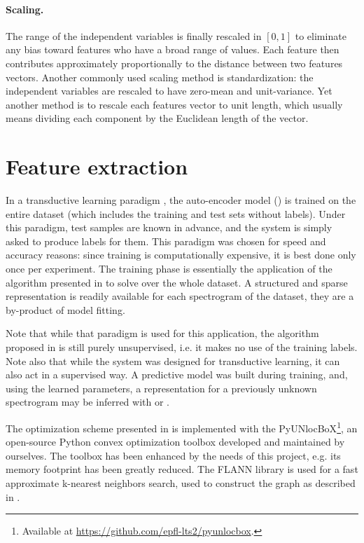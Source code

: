 \paragraph{Scaling.}
The range of the independent variables is finally rescaled in $[0,1]$ to eliminate any bias toward features who have a broad range of values. Each feature then contributes approximately proportionally to the distance between two features vectors. Another commonly used scaling method is standardization: the independent variables are rescaled to have zero-mean and unit-variance. Yet another method is to rescale each features vector to unit length, which usually means dividing each component by the Euclidean length of the vector.

\section{Feature extraction}

In a transductive learning paradigm \cite{vapnik1998transductiveLearning}, the auto-encoder model () is trained on the entire dataset (which includes the training and test sets without labels). Under this paradigm, test samples are known in advance, and the system is simply asked to produce labels for them. This paradigm was chosen for speed and accuracy reasons: since training is computationally expensive, it is best done only once per experiment. The training phase is essentially the application of the algorithm presented in  to solve  over the whole dataset. A structured and sparse representation is readily available for each spectrogram of the dataset, they are a by-product of model fitting.

Note that while that paradigm is used for this application, the algorithm proposed in  is still purely unsupervised, i.e. it makes no use of the training labels.
Note also that while the system was designed for transductive learning, it can also act in a supervised way. A predictive model was built during training, and, using the learned parameters, a representation for a previously unknown spectrogram may be inferred with  or .

The optimization scheme presented in  is implemented with the PyUNlocBoX\footnote{Available at \url{https://github.com/epfl-lts2/pyunlocbox}.}, an open-source Python convex optimization toolbox developed and maintained by ourselves. The toolbox has been enhanced by the needs of this project, e.g. its memory footprint has been greatly reduced.
The FLANN library \cite{muja2009flann} is used for a fast approximate k-nearest neighbors search, used to construct the graph as described in .


